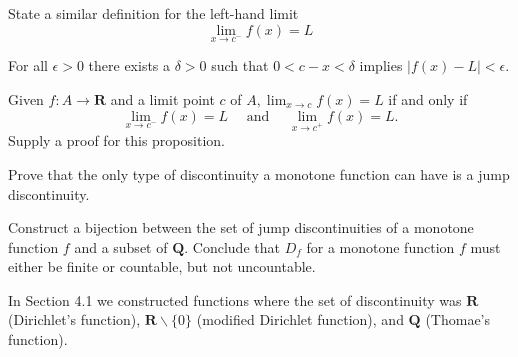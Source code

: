 \begin{exercise}
  State a similar definition for the left-hand limit
  $$
  \lim _{x \rightarrow c^{-}} f(x)=L
  $$
\end{exercise}
\begin{solution}
  For all $\epsilon > 0$ there exists a $\delta > 0$ such that $0 < c-x < \delta$ implies $|f(x)-L|<\epsilon$.
\end{solution}

\begin{exercise}
  Given $f: A \rightarrow \mathbf{R}$ and a limit point $c$ of $A, \lim _{x \rightarrow c} f(x)=L$ if and only if
  $$
  \lim _{x \rightarrow c^{-}} f(x)=L \quad \text { and } \quad \lim _{x \rightarrow c^{+}} f(x)=L .
  $$
  Supply a proof for this proposition.
\end{exercise}
\begin{solution}
  \TODO
\end{solution}

\begin{exercise}
  Prove that the only type of discontinuity a monotone function can have is a jump discontinuity.
\end{exercise}
\begin{solution}
  \TODO
\end{solution}

\begin{exercise}
  Construct a bijection between the set of jump discontinuities of a monotone function $f$ and a subset of $\mathbf{Q}$. Conclude that $D_{f}$ for a monotone function $f$ must either be finite or countable, but not uncountable.
\end{exercise}
\begin{solution}
  \TODO
\end{solution}

\begin{exercise}
  In Section 4.1 we constructed functions where the set of discontinuity was $\mathbf{R}$ (Dirichlet's function), $\mathbf{R} \backslash\{0\}$ (modified Dirichlet function), and $\mathbf{Q}$ (Thomae's function).

\end{exercise}
\begin{solution}
  \TODO
\end{solution}

